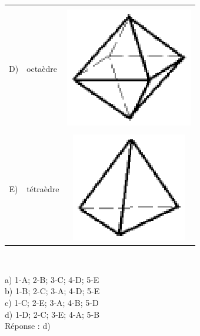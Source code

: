 \documentclass[letterpaper, 12pt]{article}
\begin{document}
\begin{center}
\begin{tabular}{|c|l|c|}
 & & \\
D) & octa\`edre & \includegraphics[scale=0.25]{polyocta.eps}\\ \hline
 & & \\
E) & t\'etra\`edre & \includegraphics[scale=0.25]{polytetra.eps}\\ \hline
\end{tabular}\\
\end{center}

a) 1-A; 2-B; 3-C; 4-D; 5-E\\
b) 1-B; 2-C; 3-A; 4-D; 5-E\\
c) 1-C; 2-E; 3-A; 4-B; 5-D\\
d) 1-D; 2-C; 3-E; 4-A; 5-B\\

R\'eponse : d)\\
\end{document}
